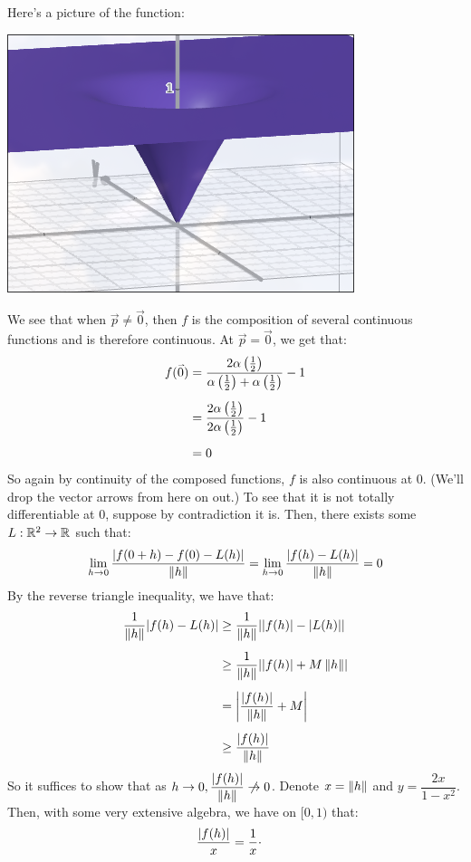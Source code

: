 \begin{pf}
    Here's a picture of the function: \vsp

    \centering
    \includegraphics[width=0.3\linewidth]{chs/figs/sinkhole.png}
    \flushleft

    We see that when $ \vec p \neq \vec{0} $, then $ f $ is the composition of
    several continuous functions and is therefore continuous.
    At $ \vec{p} = \vec{0} $, we get that:
    \begin{align*}
        f(\vec{0}) & = \frac{2\alpha\left(\frac{1}{2}\right)}
        {\alpha\left( \frac{1}{2}\right)
        + \alpha\left( \frac{1}{2} \right)} - 1 \vsp
                   & = \frac{2\alpha \left( \frac{1}{2} \right)}
                   {2\alpha \left( \frac{1}{2} \right)} - 1 \vsp
                   & = 0
    \end{align*}
    So again by continuity of the composed functions, $ f $ is also continuous
    at $ 0 $. \vsp
    (We'll drop the vector arrows from here on out.)
    To see that it is not totally differentiable at $ 0 $, suppose by
    contradiction it is. Then, there exists some $ L : \mathbb{R}^{2} \rightarrow
    \mathbb{R} $ such that:
    \begin{equation*}
        \lim_{h \rightarrow 0} \frac{\abs{f(0 + h) - f(0) - L(h)}} {\left\|h\right\|}
        = \lim_{h \rightarrow 0} \frac{\abs{f(h) - L(h)}}{\left\|h\right\|} = 0
    \end{equation*}
    By the reverse triangle inequality, we have that:
    \begin{align*}
        \frac{1}{\norm{h}}\abs{f(h) - L(h)} & \geq \frac{1}{\norm{h}}\abs{
        \abs{f(h)} - \abs{L(h)}} \vsp
        & \geq \frac{1}{\norm{h}}\abs{\abs{f(h)} + M\norm{h}} \vsp
        & = \abs{\frac{\abs{f(h)}}{\norm{h}} + M} \vsp
        & \geq \frac{\abs{f(h)}}{\norm{h}}
    \end{align*}
    So it suffices to show that as $ h \rightarrow 0,
    \dfrac{\abs{f(h)}}{\norm{h}} \cnot\rightarrow 0 $.
    Denote $ x = \left\|h\right\| $ and $ y = \dfrac{2x}{1-x^{2}} $.
    Then, with some very extensive algebra, we have on $ [0, 1) $ that:
    \begin{align*}
        \frac{\abs{f(h)}}{x} & = \frac{1}{x} \cdot

\end{align*}
\end{pf}
